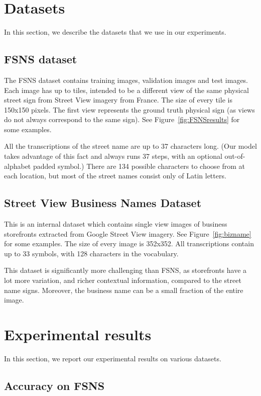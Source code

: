 \documentclass[conference]{IEEEtran}
\begin{document}
 \section{Datasets}

In this section, we describe the datasets that we use in our experiments.

\subsection{FSNS dataset}

The FSNS dataset \cite{smith2016end} contains  training
images,  validation images and  test images. Each
image has up to  tiles, intended to be a different view of the same
physical street sign from Street View imagery from France. The size of
every tile is 150x150 pixels. The first view represents the ground
truth physical sign (as views do not always correspond to the same
sign). See Figure~\ref{fig:FSNSresults} for some examples.  

All the transcriptions of the street name are up to 37 characters
long. (Our model takes advantage of this fact and always runs 37
steps, with an optional out-of-alphabet padded symbol.) There are 134
possible characters to choose from at each location, but most of the
street names consist only of Latin letters. 

\subsection{Street View Business Names Dataset}

This is an internal dataset which contains  single view
images of business storefronts extracted from Google Street View 
imagery. See Figure~\ref{fig:bizname} for some examples. The size
of every image is 352x352. All transcriptions contain up to 33
symbols, with 128 characters in the vocabulary. 

This dataset is significantly more challenging than FSNS, as
storefronts have a lot more variation, and richer contextual
information, compared to the street name signs. Moreover, the business
name can be a small fraction of the entire image. 
 \section{Experimental results}

In this section, we report our experimental results on various
datasets.

\subsection{Accuracy on FSNS}
\label{sec:accuracy}
\end{document}
